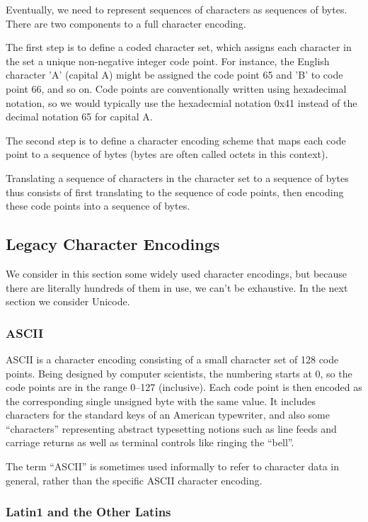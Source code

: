 Eventually, we need to represent sequences of characters as sequences
of bytes.  There are two components to a full character encoding.

The first step is to define a coded character set, which assigns each
character in the set a unique non-negative integer code point.  For
instance, the English character 'A' (capital A) might be assigned the
code point 65 and 'B' to code point 66, and so on.  Code points are
conventionally written using hexadecimal notation, so we would
typically use the hexadecmial notation 0x41 instead of the decimal
notation 65 for capital A.

The second step is to define a character encoding scheme that maps
each code point to a sequence of bytes (bytes are often called octets
in this context).

Translating a sequence of characters in the character set to a
sequence of bytes thus consists of first translating to the sequence
of code points, then encoding these code points into a sequence of
bytes.


\subsection{Legacy Character Encodings}

We consider in this section some widely used character encodings, but
because there are literally hundreds of them in use, we can't be
exhaustive.  In the next section we consider Unicode.

\subsubsection{ASCII}

ASCII is a character encoding consisting of a small character set of
128 code points.  Being designed by computer scientists, the numbering
starts at 0, so the code points are in the range 0--127 (inclusive).
Each code point is then encoded as the corresponding single unsigned
byte with the same value.  It includes characters for the standard
keys of an American typewriter, and also some ``characters''
representing abstract typesetting notions such as line feeds and
carriage returns as well as terminal controls like ringing the
``bell''.

The term ``ASCII'' is sometimes used informally to refer to character
data in general, rather than the specific ASCII character encoding.

\subsubsection{Latin1 and the Other Latins}

